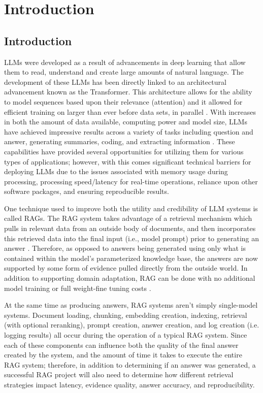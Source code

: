 \chapter{Introduction}

\section{Introduction}

\acp{LLM} were developed as a result of advancements in deep learning that allow them to read, understand and create large amounts of natural language. The development of these \acp{LLM} has been directly linked to an architectural advancement known as the Transformer. This architecture allows for the ability to model sequences based upon their relevance (attention) and it allowed for efficient training on larger than ever before data sets, in parallel \cite{vaswani2017attention}. With increases in both the amount of data available, computing power and model size, \acp{LLM} have achieved impressive results across a variety of tasks including question and answer, generating summaries, coding, and extracting information \cite{brown2020language,kaplan2020scaling}. These capabilities have provided several opportunities for utilizing them for various types of applications; however, with this comes significant technical barriers for deploying \acp{LLM} due to the issues associated with memory usage during processing, processing speed/latency for real-time operations, reliance upon other software packages, and ensuring reproducible results.

One technique used to improve both the utility and credibility of \ac{LLM} systems is called \acp{RAG}. The \ac{RAG} system takes advantage of a retrieval mechanism which pulls in relevant data from an outside body of documents, and then incorporates this retrieved data into the final input (i.e., model prompt) prior to generating an answer \cite{lewis2020rag,izacard2021leveraging}. Therefore, as opposed to answers being generated using only what is contained within the model's parameterized knowledge base, the answers are now supported by some form of evidence pulled directly from the outside world. In addition to supporting domain adaptation, \ac{RAG} can be done with no additional model training or full weight-fine tuning costs \cite{borgeaud2022retro}. 

At the same time as producing answers, \ac{RAG} systems aren't simply single-model systems. Document loading, chunking, embedding creation, indexing, retrieval (with optional reranking), prompt creation, answer creation, and log creation (i.e. logging results) all occur during the operation of a typical RAG system. Since each of these components can influence both the quality of the final answer created by the system, and the amount of time it takes to execute the entire \ac{RAG} system; therefore, in addition to determining if an answer was generated, a successful \ac{RAG} project will also need to determine how different retrieval strategies impact latency, evidence quality, answer accuracy, and reproducibility.

